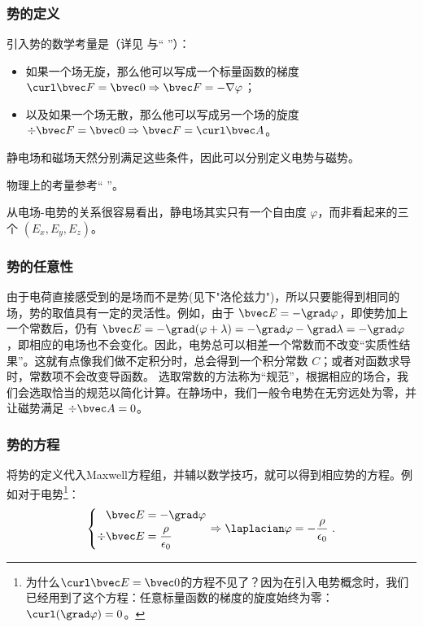 \subsubsection{势的定义}
引入势的数学考量是（详见 \cite{GriffE} 与“ ”）：
\begin{itemize}
\item 如果一个场无旋，那么他可以写成一个标量函数的梯度 $\curl \bvec F = \bvec 0 \Rightarrow \bvec F = - \nabla \varphi$；
\item 以及如果一个场无散，那么他可以写成另一个场的旋度$\div \bvec F = \bvec 0 \Rightarrow \bvec F = \curl \bvec A$。
\end{itemize}
静电场和磁场天然分别满足这些条件，因此可以分别定义电势与磁势。

物理上的考量参考“ ”。

从电场-电势的关系很容易看出，静电场其实只有一个自由度 $\varphi$，而非看起来的三个 $(E_x, E_y, E_z)$。

\subsubsection{势的任意性}
由于电荷直接感受到的是场而不是势(见下"洛伦兹力")，所以只要能得到相同的场，势的取值具有一定的灵活性。例如，由于 $\bvec E = -\grad \varphi$，即使势加上一个常数后，仍有 $\bvec E = -\grad (\varphi+\lambda) = -\grad \varphi - \grad \lambda = -\grad \varphi$，即相应的电场也不会变化。因此，电势总可以相差一个常数而不改变“实质性结果”。这就有点像我们做不定积分时，总会得到一个积分常数 $C$；或者对函数求导时，常数项不会改变导函数。
选取常数的方法称为“规范”，根据相应的场合，我们会选取恰当的规范以简化计算。在静场中，我们一般令电势在无穷远处为零，并让磁势满足 $\div \bvec A = 0$。

\subsubsection{势的方程}
将势的定义代入Maxwell方程组，并辅以数学技巧，就可以得到相应势的方程。例如对于电势\footnote{为什么$\curl \bvec E = \bvec 0$的方程不见了？因为在引入电势概念时，我们已经用到了这个方程：任意标量函数的梯度的旋度始终为零：$\curl (\grad \varphi) = 0$。}：
$$
\left \{
\begin{aligned}
\bvec E &= -\grad \varphi\\
\div \bvec E &= \frac{\rho}{\epsilon_0}\\
\end{aligned}
\right.
\Rightarrow
\laplacian \varphi = -\frac{\rho}{\epsilon_0}
~.
$$

